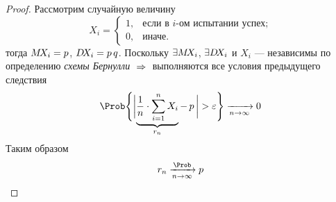 \begin{proof}
	Рассмотрим случайную величину
	\[
		X_i = \begin{cases*}
		1, & \text{если в $i$-ом испытании успех;} \\
		0, & \text{иначе.}
		\end{cases*}
	\]
	тогда $M\!X_i = p$, $D\!X_i = p\,q$. Поскольку $\exists M\!X_i$, $\exists D\!X_i$ и $X_i$ --- независимы по определению \emph{схемы Бернулли} $\;\Rightarrow\;$ выполняются все условия предыдущего следствия
	\[
		\Prob\Biggl\{ \biggl| \underbrace{\frac{1}{n} \cdot \sum_{i = 1}^{n} X_i}_{r_n} -\, p\, \biggr| > \varepsilon \Biggr\} \xrightarrow[n\to\infty]{} 0
	\]
	Таким образом
	\[
		r_n \xrightarrow[n\to\infty]{\Prob} p
	\]
\end{proof}